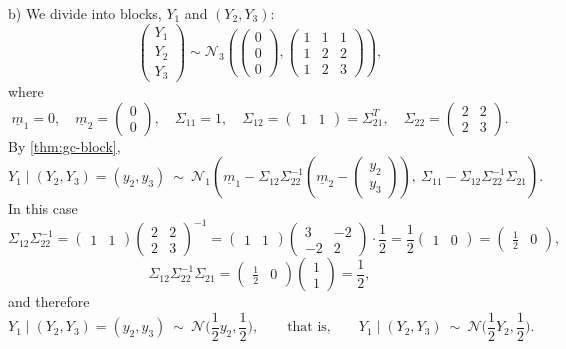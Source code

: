 \begin{example}
b) We divide into blocks, $Y_1$ and $(Y_2,Y_3)$:
\[
  \begin{pmatrix}Y_1\\\hline Y_2\\Y_3\end{pmatrix}\sim\mathcal N_3\left(\left(\begin{array}{c}0\\\hline0\\0\end{array}\right),
  \left(\begin{array}{c|cc}1&1&1\\\hline1&2&2\\1&2&3\end{array}\right)\right),
\]
where
\[
  \underline m_1=0,\quad \underline m_2=\begin{pmatrix}0\\0\end{pmatrix},\quad\Sigma_{11}=1,\quad
  \Sigma_{12}=\begin{pmatrix}1&1\end{pmatrix}=\Sigma_{21}^T,\quad\Sigma_{22}=\begin{pmatrix}2&2\\2&3\end{pmatrix}.
\]
By \cref{thm:gc-block},
\[
  Y_1\mid(Y_2,Y_3)=(y_2,y_3)\ \sim\ \mathcal N_1\left(\underline m_1-\Sigma_{12}\Sigma_{22}^{-1}\left(\underline m_2-\begin{pmatrix}y_2\\y_3\end{pmatrix}\right),\
  \Sigma_{11}-\Sigma_{12}\Sigma_{22}^{-1}\Sigma_{21}\right).
\]
In this case
\[
  \Sigma_{12}\Sigma_{22}^{-1}=\begin{pmatrix}1&1\end{pmatrix}\begin{pmatrix}2&2\\2&3\end{pmatrix}^{-1}
  =\begin{pmatrix}1&1\end{pmatrix}\begin{pmatrix}3&-2\\-2&2\end{pmatrix}\cdot\frac12=\frac12\begin{pmatrix}1&0\end{pmatrix}
  =\begin{pmatrix}\frac12&0\end{pmatrix},
\]
\[
  \Sigma_{12}\Sigma_{22}^{-1}\Sigma_{21}=\begin{pmatrix}\frac12&0\end{pmatrix}\begin{pmatrix}1\\1\end{pmatrix}=\frac12,
\]
and therefore
\[
  Y_1\mid(Y_2,Y_3)=(y_2,y_3)\ \sim\ \mathcal N\Big(\frac12y_2,\frac12\Big),\qquad\text{that is,}\qquad
  Y_1\mid(Y_2,Y_3)\ \sim\ \mathcal N\Big(\frac12Y_2,\frac12\Big).
\]
\end{example}

